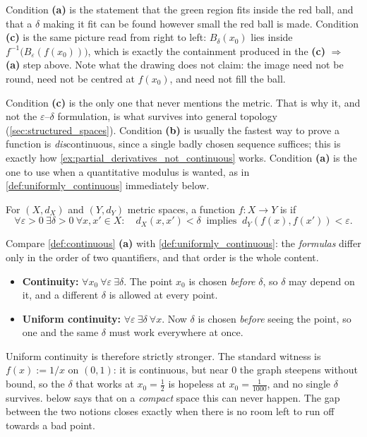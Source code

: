 Condition \textbf{(a)} is the statement that the green region fits inside the red ball, and that
a $\delta$ making it fit can be found however small the red ball is made. Condition \textbf{(c)}
is the same picture read from right to left: $B_\delta(x_0)$ lies inside
$f^{-1}\big(B_\varepsilon(f(x_0))\big)$, which is exactly the containment produced in the
\textbf{(c)} $\Rightarrow$ \textbf{(a)} step above. Note what the drawing does not claim: the
image need not be round, need not be centred at $f(x_0)$, and need not fill the ball.

\begin{remark}
Condition \textbf{(c)} is the only one that never mentions the metric. That is why it, and not the
$\varepsilon$--$\delta$ formulation, is what survives into general topology
(\cref{sec:structured_spaces}). Condition \textbf{(b)} is usually the fastest way to prove a
function is \emph{dis}continuous, since a single badly chosen sequence suffices; this is exactly
how \cref{ex:partial_derivatives_not_continuous} works. Condition \textbf{(a)} is the
one to use when a quantitative modulus is wanted, as in
\cref{def:uniformly_continuous} immediately below.
\end{remark}

\begin{definition}
\label{def:uniformly_continuous}
For $(X,d_X)$ and $(Y,d_Y)$ metric spaces, a function $f : X \to Y$ is   if
\[\forall \varepsilon > 0 \ \exists \delta > 0 \ \forall x, x' \in X : \quad d_X(x,x') < \delta \ \text{ implies } \ d_Y(f(x),f(x')) < \varepsilon.\]
\end{definition}

\begin{importantremark}
\label{rem:continuity_vs_uniform_continuity}
Compare \cref{def:continuous} \textbf{(a)} with \cref{def:uniformly_continuous}: the
\emph{formulas} differ only in the order of two quantifiers, and that order is the whole
content.
\begin{itemize}
  \item \textbf{Continuity:} $\forall x_0\ \forall\varepsilon\ \exists\delta$. The point $x_0$
    is chosen \emph{before} $\delta$, so $\delta$ may depend on it, and a different $\delta$ is
    allowed at every point.
  \item \textbf{Uniform continuity:} $\forall\varepsilon\ \exists\delta\ \forall x$. Now
    $\delta$ is chosen \emph{before} seeing the point, so one and the same $\delta$ must work
    everywhere at once.
\end{itemize}
Uniform continuity is therefore strictly stronger. The standard witness is
$f(x) := 1/x$ on $(0,1)$: it is continuous, but near $0$ the graph steepens without bound, so
the $\delta$ that works at $x_0 = \tfrac12$ is hopeless at $x_0 = \tfrac{1}{1000}$, and no
single $\delta$ survives.  below says that on a
\emph{compact} space this can never happen. The gap between the two notions closes exactly when
there is no room left to run off towards a bad point.
\end{importantremark}

